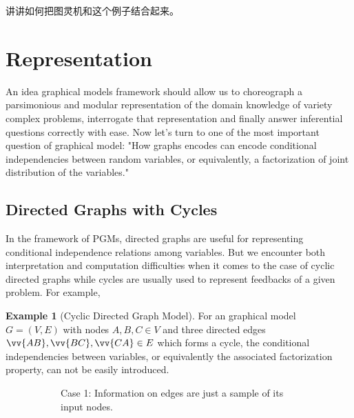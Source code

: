 \documentclass{article}
\theoremstyle{definition}
\theoremstyle{remark}
\theoremstyle{definition}
\newtheorem{example}{Example}[section]
\begin{document}
\begin{CJK*}{UTF8}{gbsn}
讲讲如何把图灵机和这个例子结合起来。 



\section{Representation} \label{sec:repre}


An idea graphical models framework should allow us to choreograph a parsimonious and modular representation of the domain knowledge of variety complex problems, interrogate that representation and finally answer inferential questions correctly with ease. Now let's turn to one of the most important question of graphical model: "How graphs encodes can encode conditional independencies between random variables, or equivalently, a factorization of joint distribution of the variables."

\subsection{Directed Graphs with Cycles}

In the framework of PGMs, directed graphs are useful for representing conditional independence relations among variables. %
But we encounter both interpretation and computation difficulties when it comes to the case of cyclic directed graphs while cycles are usually used to represent feedbacks of a given problem\cite{bongers2016theoretical}. For example, 

\begin{example}[Cyclic Directed Graph Model]
\label{eg:cycleDG}
For an graphical model $G=(V, E)$ with nodes $A, B, C \in V$ and three directed edges $\vv{AB}, \vv{BC}, \vv{CA} \in E$ which forms a cycle, the conditional independencies between variables, or equivalently the associated factorization property, can not be easily introduced.   


\begin{figure}[h]
	\begin{subfigure}[tb]{0.45\textwidth}
		\centering
		\caption{Case 1: Information on edges are just a sample of its input nodes.}
		\label{fig:onesample}
	\end{subfigure}
    \hfill
	\begin{subfigure}[tb]{0.45\textwidth}
		\centering
\end{subfigure}
\end{figure}
\end{example}
\end{CJK*}
\end{document}
